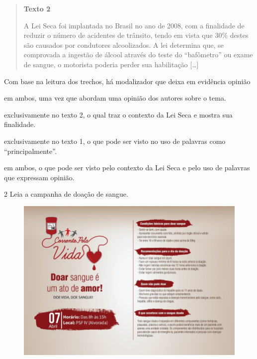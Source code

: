 \begin{quote}
\textbf{Texto 2}

A Lei Seca foi implantada no Brasil no ano de 2008, com a finalidade de
reduzir o número de acidentes de trânsito, tendo em vista que 30\%
destes são causados por condutores alcoolizados. A lei determina que, se
comprovada a ingestão de álcool através do teste do ``bafômetro'' ou
exame de sangue, o motorista poderia perder sua habilitação
{[}\ldots{}{]}

\end{quote}

Com base na leitura dos trechos, há modalizador que deixa em evidência
opinião

\begin{escolha}
\item em ambos, uma vez que abordam uma opinião dos autores sobre o tema.

\item exclusivamente no texto 2, o qual traz o contexto da Lei Seca e
mostra sua finalidade.

\item exclusivamente no texto 1, o que pode ser visto no uso de palavras
como ``principalmente''.

\item em ambos, o que pode ser visto pelo contexto da Lei Seca e pelo uso
de palavras que expressam opinião.
\end{escolha}

\num{2} Leia a campanha de doação de sangue.

\begin{figure}[htpb!]
\centering
\includegraphics[width=\textwidth]{./_SAEB_9_POR/media/image22.png}
\end{figure}

